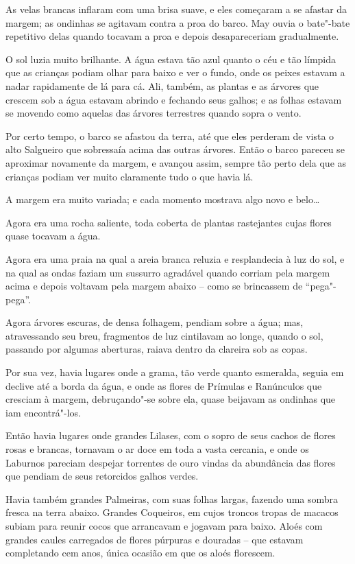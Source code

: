 As velas brancas inflaram com uma brisa suave, e eles começaram a se
afastar da margem; as ondinhas se agitavam contra a proa do barco. May
ouvia o bate"-bate repetitivo delas quando tocavam a proa e depois desapareceriam gradualmente.

O sol luzia muito brilhante. A água estava tão azul quanto o céu e tão
límpida que as crianças podiam olhar para baixo e ver o fundo, onde os
peixes estavam a nadar rapidamente de lá para cá. Ali, também, as
plantas e as árvores que crescem sob a água estavam abrindo e fechando
seus galhos; e as folhas estavam se movendo como aquelas das árvores
terrestres quando sopra o vento.

Por certo tempo, o barco se afastou da terra, até que eles perderam de
vista o alto Salgueiro que sobressaía acima das outras árvores. Então o
barco pareceu se aproximar novamente da margem, e avançou assim, sempre
tão perto dela que as crianças podiam ver muito claramente tudo o que
havia lá.

A margem era muito variada; e cada momento mostrava algo novo e
belo…

Agora era uma rocha saliente, toda coberta de plantas rastejantes cujas
flores quase tocavam a água.

Agora era uma praia na qual a areia branca reluzia e resplandecia à luz
do sol, e na qual as ondas faziam um sussurro agradável quando corriam
pela margem acima e depois voltavam pela margem abaixo -- como se
brincassem de ``pega"-pega''.

Agora árvores escuras, de densa folhagem, pendiam sobre a água; mas,
atravessando seu breu, fragmentos de luz cintilavam ao longe, quando o
sol, passando por algumas aberturas, raiava dentro da clareira sob as
copas.

Por sua vez, havia lugares onde a grama, tão verde quanto esmeralda,
seguia em declive até a borda da água, e onde as flores de Prímulas e
Ranúnculos que cresciam à margem, debruçando"-se sobre ela, quase
beijavam as ondinhas que iam encontrá"-los.

Então havia lugares onde grandes Lilases, com o sopro de seus cachos de
flores rosas e brancas, tornavam o ar doce em toda a vasta cercania, e
onde os Laburnos pareciam despejar torrentes de ouro vindas da
abundância das flores que pendiam de seus retorcidos galhos verdes.

Havia também grandes Palmeiras, com suas folhas largas, fazendo uma
sombra fresca na terra abaixo. Grandes Coqueiros, em cujos troncos
tropas de macacos subiam para reunir cocos que arrancavam
e jogavam para baixo. Aloés com grandes caules carregados de flores
púrpuras e douradas -- que estavam completando cem anos, única ocasião
em que os aloés florescem.

